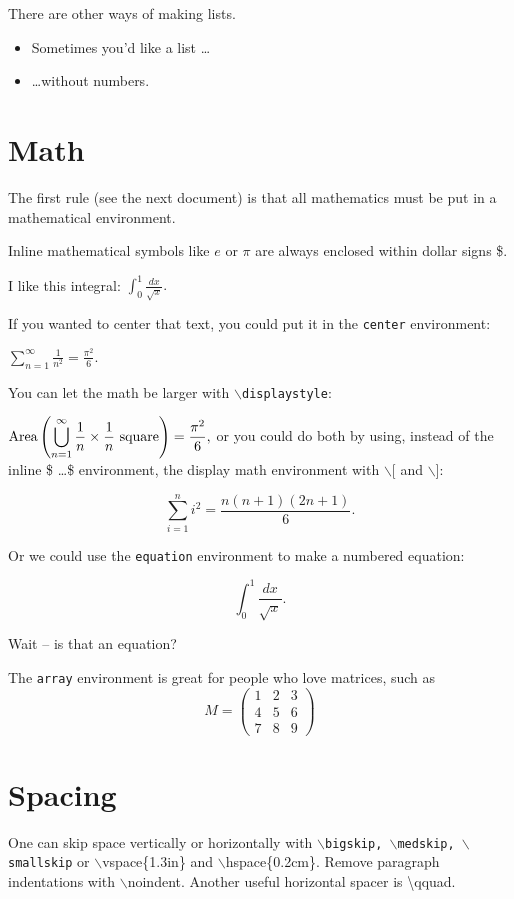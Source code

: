 \documentclass{article}  %
\begin{document}
There are other ways of making lists.

\begin{itemize}
\item Sometimes you'd like a list \dots
\item \dots without numbers.
\end{itemize}

\section{Math}

The first rule (see the next document) is that all mathematics must be put in a mathematical environment.  

Inline mathematical symbols like $e$ or $\pi$ are always enclosed within dollar signs \$.

I like this integral: $ \int_0^1 \frac{dx}{\sqrt x}.$

If you wanted to center that text, you could put it in the \texttt{center} environment:

\begin{center}
$\sum_{n = 1}^{\infty} \frac{1}{n^2} = \frac{\pi^2}{6}.$
\end{center}

You can let the math be larger with $\backslash$\texttt{displaystyle}:


$\displaystyle \hbox{Area}\left( \bigcup_{n = 1}^{\infty} \frac{1}{n}\times \frac{1}{n}\hbox{ square}\right) = \frac{\pi^2}{6},$
or you could do both by using, instead of the inline \$ \dots \$ environment, the display math environment with $\backslash[$ and $\backslash]$:

\[
\sum_{i=1}^n i^2 = \frac{n(n+1)(2n+1)}{6}.
\]

Or we could use the \texttt{equation} environment to make a numbered equation:

\begin{equation}
 \int_0^1 \frac{dx}{\sqrt x}.
\end{equation}

Wait -- is that  an equation?

The \texttt{array} environment is great for people who love matrices, such as
\[
M=\left(
\begin{array}{ccc}
1 & 2&3 \\
4&5&6 \\
7&8&9
\end{array}
\right)
\]

\section{Spacing}
One can skip space vertically or horizontally with \texttt{$\backslash$bigskip, $\backslash$medskip, $\backslash$smallskip}
or $\backslash$vspace\{1.3in\} and $\backslash$hspace\{0.2cm\}.  Remove paragraph indentations with $\backslash$noindent.  Another useful horizontal spacer is \textbackslash qquad.
\end{document}
